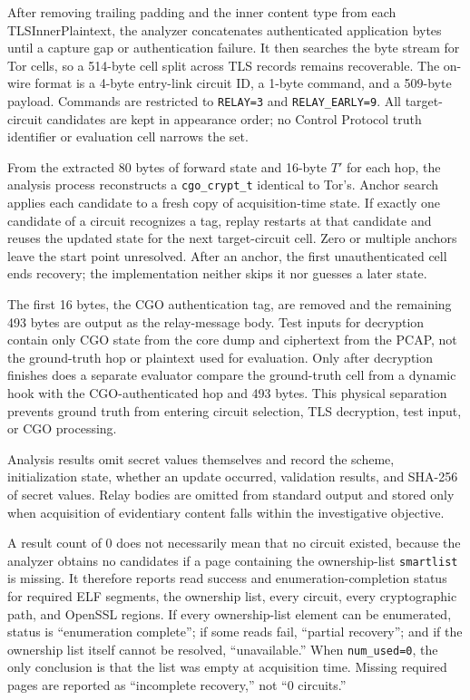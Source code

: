 \documentclass[10pt,a4paper]{article}
\newcommand{\code}[1]{\nolinkurl{#1}}
\begin{document}
After removing trailing padding and the inner content type from each TLSInnerPlaintext, the analyzer concatenates authenticated application bytes until a capture gap or authentication failure. It then searches the byte stream for Tor cells, so a 514-byte cell split across TLS records remains recoverable. The on-wire format is a 4-byte entry-link circuit ID, a 1-byte command, and a 509-byte payload. Commands are restricted to \code{RELAY=3} and \code{RELAY_EARLY=9}. All target-circuit candidates are kept in appearance order; no Control Protocol truth identifier or evaluation cell narrows the set.


From the extracted 80 bytes of forward state and 16-byte $T'$ for each hop, the analysis process reconstructs a \code{cgo_crypt_t} identical to Tor's. Anchor search applies each candidate to a fresh copy of acquisition-time state. If exactly one candidate of a circuit recognizes a tag, replay restarts at that candidate and reuses the updated state for the next target-circuit cell. Zero or multiple anchors leave the start point unresolved. After an anchor, the first unauthenticated cell ends recovery; the implementation neither skips it nor guesses a later state.

The first 16 bytes, the CGO authentication tag, are removed and the remaining 493 bytes are output as the relay-message body. Test inputs for decryption contain only CGO state from the core dump and ciphertext from the PCAP, not the ground-truth hop or plaintext used for evaluation. Only after decryption finishes does a separate evaluator compare the ground-truth cell from a dynamic hook with the CGO-authenticated hop and 493 bytes. This physical separation prevents ground truth from entering circuit selection, TLS decryption, test input, or CGO processing.

Analysis results omit secret values themselves and record the scheme, initialization state, whether an update occurred, validation results, and SHA-256 of secret values. Relay bodies are omitted from standard output and stored only when acquisition of evidentiary content falls within the investigative objective.


A result count of 0 does not necessarily mean that no circuit existed, because the analyzer obtains no candidates if a page containing the ownership-list \code{smartlist} is missing.
It therefore reports read success and enumeration-completion status for required ELF segments, the ownership list, every circuit, every cryptographic path, and OpenSSL regions.
If every ownership-list element can be enumerated, status is ``enumeration complete''; if some reads fail, ``partial recovery''; and if the ownership list itself cannot be resolved, ``unavailable.'' When \code{num_used=0}, the only conclusion is that the list was empty at acquisition time. Missing required pages are reported as ``incomplete recovery,'' not ``0 circuits.''
\end{document}
